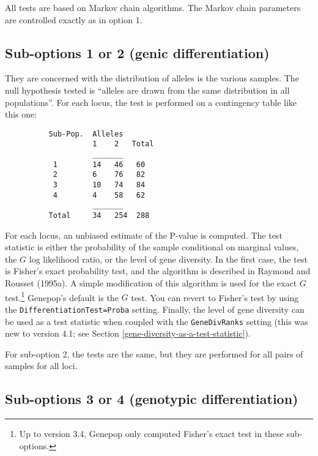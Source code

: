\documentclass[12pt,]{book}
\let\rmarkdownfootnote\footnote%
\def\footnote{\protect\rmarkdownfootnote}
\begin{document}
All tests are based on Markov chain algorithms. The Markov chain
parameters are controlled exactly as in option 1.

\subsection{Sub-options 1 or 2 (genic
differentiation)}\label{sub-options-1-or-2-genic-differentiation}

 They are concerned with the distribution
of alleles is the various samples. The null hypothesis tested is
``alleles are drawn from the same distribution in all populations''. For
each locus, the test is performed on a contingency table like this one:

\begin{verbatim}
          Sub-Pop.  Alleles
                    1    2   Total
                    _______
           1        14   46   60
           2        6    76   82
           3        10   74   84
           4        4    58   62
                    _______
          Total     34   254  288
\end{verbatim}

For each locus, an unbiased estimate of the P-value is computed. The
test statistic is either the probability of the sample conditional on
marginal values, the \(G\) log likelihood ratio, or the level of gene
diversity. In the first case, the test is Fisher's exact probability
test, and the algorithm is described in Raymond and Rousset (1995a). A
simple modification of this algorithm is used for the exact \(G\)
test.\footnote{Up to version 3.4, Genepop only computed Fisher's exact
  test in these sub-options.} Genepop's default is the \(G\) test. You
can revert to Fisher's test by using the
\texttt{DifferentiationTest=Proba}
setting. Finally, the level of gene diversity can be used as a test
statistic when coupled with the \texttt{GeneDivRanks} setting (this was
new to version 4.1; see Section
\ref{gene-diversity-as-a-test-statistic}).

For sub-option 2, the tests are the same, but they are performed for all
pairs of samples for all loci.

\subsection{Sub-options 3 or 4 (genotypic
differentiation)}\label{sub-options-3-or-4-genotypic-differentiation}
\end{document}
